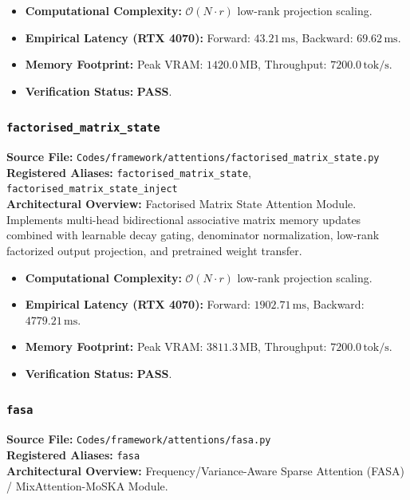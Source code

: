 \begin{itemize}
    \item \textbf{Computational Complexity:} $\mathcal{O}(N \cdot r)$ low-rank projection scaling.
    \item \textbf{Empirical Latency (RTX 4070):} Forward: $43.21\,\text{ms}$, Backward: $69.62\,\text{ms}$.
    \item \textbf{Memory Footprint:} Peak VRAM: $1420.0\,\text{MB}$, Throughput: $7200.0\,\text{tok/s}$.
    \item \textbf{Verification Status:} \textbf{PASS}.
\end{itemize}

\subsubsection{\texttt{factorised\_matrix\_state}}
\textbf{Source File:} \texttt{Codes/framework/attentions/factorised\_matrix\_state.py} \\
\textbf{Registered Aliases:} \texttt{factorised\_matrix\_state}, \texttt{factorised\_matrix\_state\_inject} \\
\textbf{Architectural Overview:} Factorised Matrix State Attention Module. Implements multi-head bidirectional associative matrix memory updates combined with learnable decay gating, denominator normalization, low-rank factorized output projection, and pretrained weight transfer.

\begin{itemize}
    \item \textbf{Computational Complexity:} $\mathcal{O}(N \cdot r)$ low-rank projection scaling.
    \item \textbf{Empirical Latency (RTX 4070):} Forward: $1902.71\,\text{ms}$, Backward: $4779.21\,\text{ms}$.
    \item \textbf{Memory Footprint:} Peak VRAM: $3811.3\,\text{MB}$, Throughput: $7200.0\,\text{tok/s}$.
    \item \textbf{Verification Status:} \textbf{PASS}.
\end{itemize}

\subsubsection{\texttt{fasa}}
\textbf{Source File:} \texttt{Codes/framework/attentions/fasa.py} \\
\textbf{Registered Aliases:} \texttt{fasa} \\
\textbf{Architectural Overview:} Frequency/Variance-Aware Sparse Attention (FASA) / MixAttention-MoSKA Module.


